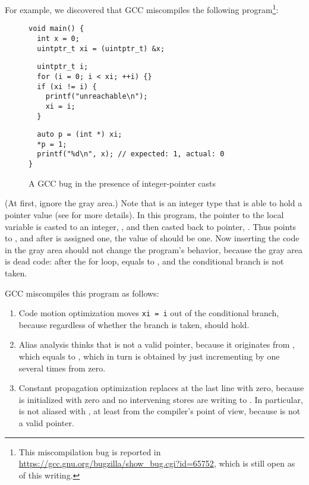 For example, we discovered that GCC miscompiles the following program\footnote{This miscompilation
  bug is reported in \url{https://gcc.gnu.org/bugzilla/show_bug.cgi?id=65752}, which is still open
  as of this writing.}:
%
\begin{figure}
\begin{center}
\small
\begin{minipage}{0.5\textwidth}
\begin{verbatim}
void main() { 
  int x = 0;
  uintptr_t xi = (uintptr_t) &x;
\end{verbatim}
\vskip -0.7cm
\begin{verbatim}
  uintptr_t i;
  for (i = 0; i < xi; ++i) {}
  if (xi != i) {
    printf("unreachable\n");
    xi = i;
  }
\end{verbatim}
\vskip -0.7cm
\begin{verbatim}
  auto p = (int *) xi;
  *p = 1;
  printf("%d\n", x); // expected: 1, actual: 0
}
\end{verbatim}
\end{minipage}
\end{center}
\caption{A GCC bug in the presence of integer-pointer casts}
\label{fig:introduction:bug}
\end{figure}

\noindent (At first, ignore the gray area.)  Note that  is an integer type that is
able to hold a pointer value (see  for more details).  In this program, the
pointer to the local variable  is casted to an integer, , and then casted back to
pointer, .  Thus  points to , and after  is assigned one, the value
of  should be one.  Now inserting the code in the gray area should not change the program's
behavior, because the gray area is dead code: after the for loop,  equals to , and
the conditional branch is not taken.

GCC miscompiles this program as follows:
%
\begin{enumerate}
\item Code motion optimization moves \texttt{xi = i} out of the conditional branch, because
  regardless of whether the branch is taken,  should hold.
\item Alias analysis thinks that  is not a valid pointer, because it originates from
  , which equals to , which in turn is obtained by just incrementing by one several
  times from zero.
\item Constant propagation optimization replaces  at the last line with zero, because
   is initialized with zero and no intervening stores are writing to .  In
  particular,  is not aliased with , at least from the compiler's point of view,
  because  is not a valid pointer.
\end{enumerate}

